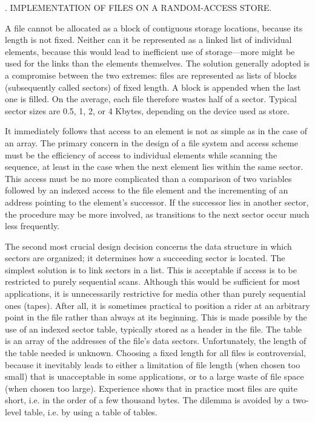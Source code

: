 . IMPLEMENTATION OF FILES ON A RANDOM-ACCESS STORE.

A file cannot be allocated as a block of contiguous storage locations, because its length is not fixed. Neither can it be represented as a linked list of individual elements, because this would lead to inefficient use of storage---more might be used for the links than the elements themselves. The solution generally adopted is a compromise between the two extremes: files are represented as lists of blocks (subsequently called sectors) of fixed length. A block is appended when the last one is filled. On the average, each file therefore wastes half of a sector. Typical sector sizes are 0.5, 1, 2, or 4 Kbytes, depending on the device used as store.

It immediately follows that access to an element is not as simple as in the case of an array. The primary concern in the design of a file system and access scheme must be the efficiency of access to individual elements while scanning the sequence, at least in the case when the next element lies within the same sector. This access must be no more complicated than a comparison of two variables followed by an indexed access to the file element and the incrementing of an address pointing to the element's successor. If the successor lies in another sector, the procedure may be more involved, as transitions to the next sector occur much less frequently.

The second most crucial design decision concerns the data structure in which sectors are organized; it determines how a succeeding sector is located. The simplest solution is to link sectors in a list. This is acceptable if access is to be restricted to purely sequential scans. Although this would be sufficient for most applications, it is unnecessarily restrictive for media other than purely sequential ones (tapes). After all, it is sometimes practical to position a rider at an arbitrary point in the file rather than always at its beginning. This is made possible by the use of an indexed sector table, typically stored as a header in the file. The table is an array of the addresses of the file's data sectors. Unfortunately, the length of the table needed is unknown. Choosing a fixed length for all files is controversial, because it inevitably leads to either a limitation of file length (when chosen too small) that is unacceptable in some applications, or to a large waste of file space (when chosen too large). Experience shows that in practice most files are quite short, i.e. in the order of a few thousand bytes. The dilemma is avoided by a two-level table, i.e. by using a table of tables.

